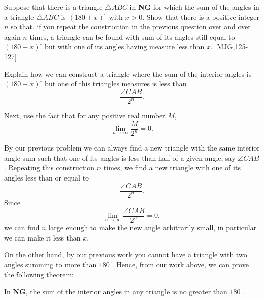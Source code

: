 \documentclass[handout]{ximera}
\begin{document}
\begin{question}
\label{121} Suppose that there is a triangle $\triangle ABC$ in
\textbf{NG} for which the sum of the angles in a triangle $\triangle
ABC$ is $\left( 180+x\right)^\circ$ with $x>0$. Show that there is a
positive integer $n$ so that, if you repeat the construction in the
previous question over and over again $n$-times, a triangle can be
found with sum of its angles still equal to $\left(180+x\right)^\circ$
but with one of its angles having measure less than $x$. [MJG,125-127]

\begin{solution}
\begin{hint}
Explain how we can construct a triangle where the sum of the interior
angles is $(180+x)^\circ$ but one of this triangles measures is less than
\[
\frac{\angle CAB}{2^n}.
\]
\end{hint}
\begin{hint}
Next, use the fact that for any positive real number $M$,
\[
\lim_{n\to \infty}\frac{M}{2^n} = 0.
\]
\end{hint}
\begin{freeResponse}
By our previous problem we can always find a new triangle with the
same interior angle sum such that one of its angles is less than half
of a given angle, say $\angle CAB$. Repeating this construction $n$
times, we find a new triangle with one of its angles less than or
equal to
\[
\frac{\angle CAB}{2^n}.
\]
Since 
\[
\lim_{n\to \infty}\frac{\angle CAB}{2^n} = 0,
\]
we can find $n$ large enough to make the new angle arbitrarily small, in
particular we can make it less than $x$.
\end{freeResponse}
\end{solution}
\end{question}


On the other hand, by our previous work%
you cannot have a triangle with two angles summing to more than
$180^\circ$. Hence, from our work above, we can prove the following
theorem:

\begin{theorem}
In \textbf{NG}, the sum of the interior angles in any triangle is no greater
than $180^\circ$.
\end{theorem}
\end{document}
